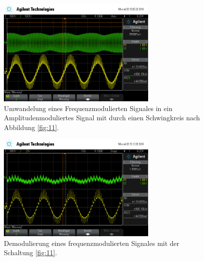 \begin{figure}
  \centering
  \includegraphics[width=0.7\textwidth]{osci/freq_demod_amp.png}
  \caption{Umwandelung eines Frequenzmodulierten Signales in ein Amplitudenmoduliertes
Signal mit durch einen Schwingkreis nach Abbildung \ref{fig:11}.}
\label{fig:freq_zu_amp}
\end{figure}



\begin{figure}
  \centering
  \includegraphics[width=0.7\textwidth]{osci/freq_demod.png}
  \caption{Demodulierung eines frequenzmodulierten Signales
  mit der Schaltung \ref{fig:11}.}
\label{fig:demod_frequenz}
\end{figure}
